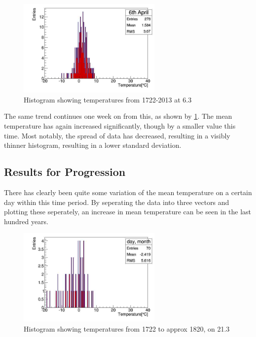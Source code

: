 \documentclass[a4paper,10pt,oneside]{article}
\begin{document}
\begin{figure}[!ht]
\begin{center}
 \includegraphics[width=7cm]{../Code/2week.jpg}
 \caption{Histogram showing temperatures from 1722-2013 at 6.3}
 \label{fig:twoweek}
 \end{center}
\end{figure}

The same trend continues one week on from this, as shown by \ref{fig:twoweek}. The mean temperature has again increased significantly,
though by a smaller value this time. Most notably, the spread of data has decreased, resulting in a visibly thinner histogram, resulting
in a lower standard deviation.

\subsection{Results for Progression}
\label{sec:prog}

There has clearly been quite some variation of the mean temperature on a certain day within
this time period. By seperating the data into three vectors and plotting these seperately, an increase
in mean temperature can be seen in the last hundred years.
\begin{figure}[!ht]
\begin{center}
 \includegraphics[width=7cm]{../Code/1.jpg}
 \caption{Histogram showing temperatures from 1722 to approx 1820, on 21.3}
 \label{fig:one}
 \end{center}
\end{figure}
\end{document}
